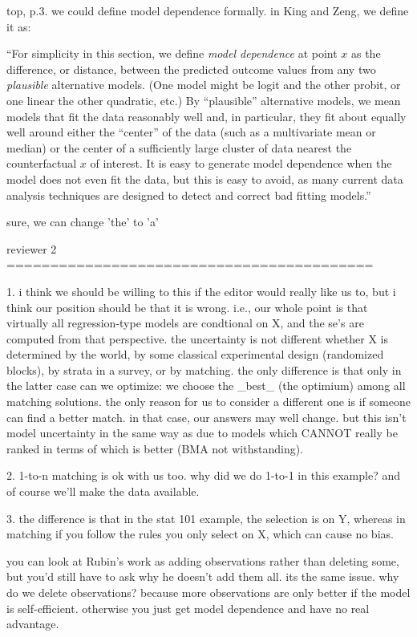 top, p.3. we could define model dependence formally.  in King and
Zeng, we define it as:

``For simplicity in this section, we define \emph{model dependence} at
point $x$ as the difference, or distance, between the predicted
outcome values from any two \emph{plausible} alternative models.  (One
model might be logit and the other probit, or one linear the other
quadratic, etc.)  By ``plausible'' alternative models, we mean models
that fit the data reasonably well and, in particular, they fit about
equally well around either the ``center'' of the data (such as a
multivariate mean or median) or the center of a sufficiently large
cluster of data nearest the counterfactual $x$ of interest. It is easy
to generate model dependence when the model does not even fit the
data, but this is easy to avoid, as many current data analysis
techniques are designed to detect and correct bad fitting models.''

sure, we can change 'the' to 'a'

reviewer 2 ==========================================

1. i think we should be willing to this if the editor would really
like us to, but i think our position should be that it is wrong.
i.e., our whole point is that virtually all regression-type models are
condtional on X, and the se's are computed from that perspective.  the
uncertainty is not different whether X is determined by the world, by
some classical experimental design (randomized blocks), by strata in a
survey, or by matching.  the only difference is that only in the
latter case can we optimize: we choose the _best_ (the optimium) among
all matching solutions.  the only reason for us to consider a
different one is if someone can find a better match.  in that case,
our answers may well change.  but this isn't model uncertainty in the
same way as due to models which CANNOT really be ranked in terms of
which is better (BMA not withstanding).

2. 1-to-n matching is ok with us too.  why did we do 1-to-1 in this
example?  and of course we'll make the data available.

3.  the difference is that in the stat 101 example, the selection is
on Y, whereas in matching if you follow the rules you only select on
X, which can cause no bias.

you can look at Rubin's work as adding observations rather than
deleting some, but you'd still have to ask why he doesn't add them
all.  its the same issue.  why do we delete observations?  because
more observations are only better if the model is self-efficient.
otherwise you just get model dependence and have no real advantage.

